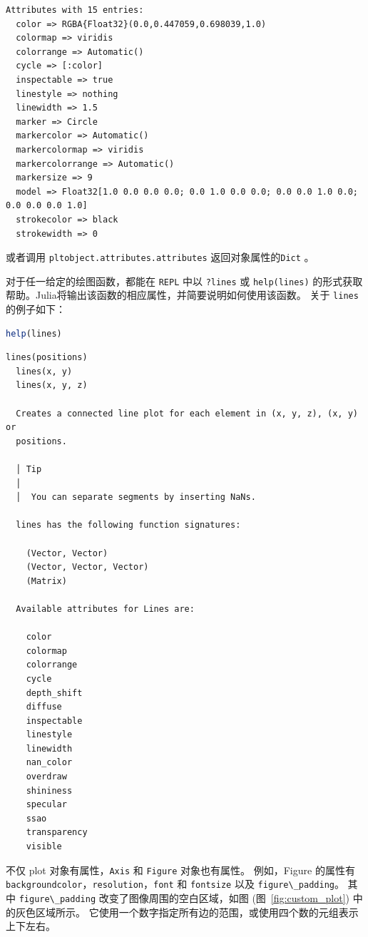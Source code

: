 \documentclass[
  notoc %
]{tufte-book}
\newcommand{\passthrough}[1]{#1}
\begin{document}
\begin{lstlisting}[language=Output]
Attributes with 15 entries:
  color => RGBA{Float32}(0.0,0.447059,0.698039,1.0)
  colormap => viridis
  colorrange => Automatic()
  cycle => [:color]
  inspectable => true
  linestyle => nothing
  linewidth => 1.5
  marker => Circle
  markercolor => Automatic()
  markercolormap => viridis
  markercolorrange => Automatic()
  markersize => 9
  model => Float32[1.0 0.0 0.0 0.0; 0.0 1.0 0.0 0.0; 0.0 0.0 1.0 0.0; 0.0 0.0 0.0 1.0]
  strokecolor => black
  strokewidth => 0
\end{lstlisting}

或者调用 \passthrough{\lstinline!pltobject.attributes.attributes!}
返回对象属性的\passthrough{\lstinline!Dict!} 。

对于任一给定的绘图函数，都能在 \passthrough{\lstinline!REPL!} 中以
\passthrough{\lstinline!?lines!} 或
\passthrough{\lstinline!help(lines)!}
的形式获取帮助。Julia将输出该函数的相应属性，并简要说明如何使用该函数。
关于 \passthrough{\lstinline!lines!} 的例子如下：

\begin{lstlisting}[language=Julia]
help(lines)
\end{lstlisting}

\begin{lstlisting}[language=Output]
  lines(positions)
  lines(x, y)
  lines(x, y, z)

  Creates a connected line plot for each element in (x, y, z), (x, y) or
  positions.

  │ Tip
  │
  │  You can separate segments by inserting NaNs.

  lines has the following function signatures:

    (Vector, Vector)
    (Vector, Vector, Vector)
    (Matrix)

  Available attributes for Lines are:

    color
    colormap
    colorrange
    cycle
    depth_shift
    diffuse
    inspectable
    linestyle
    linewidth
    nan_color
    overdraw
    shininess
    specular
    ssao
    transparency
    visible
\end{lstlisting}

不仅 plot 对象有属性，\passthrough{\lstinline!Axis!} 和
\passthrough{\lstinline!Figure!} 对象也有属性。 例如，Figure 的属性有
\passthrough{\lstinline!backgroundcolor!}，\passthrough{\lstinline!resolution!}，\passthrough{\lstinline!font!}
和 \passthrough{\lstinline!fontsize!} 以及
\passthrough{\lstinline!figure\_padding!}。 其中
\passthrough{\lstinline!figure\_padding!} 改变了图像周围的空白区域，如图
(图~\ref{fig:custom_plot}) 中的灰色区域所示。
它使用一个数字指定所有边的范围，或使用四个数的元组表示上下左右。
\end{document}
